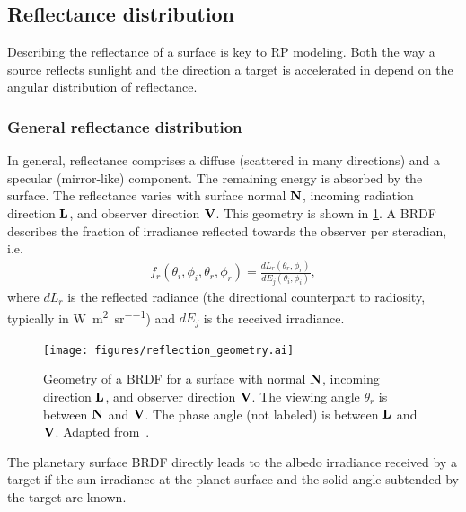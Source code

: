 \subsection{Reflectance distribution}
\label{subsec:general-reflectance-distribution}

Describing the reflectance of a surface is key to \gls{RP} modeling. Both the way a source reflects sunlight and the direction a target is accelerated in depend on the angular distribution of reflectance.

\subsubsection{General reflectance distribution}
In general, reflectance comprises a diffuse (scattered in many directions) and a specular (mirror-like) component. The remaining energy is absorbed by the surface. The reflectance varies with surface normal $\vb N$, incoming radiation direction $\vb L$, and observer direction $\vb V$. This geometry is shown in \cref{fig:reflection-geometry}. A \gls{BRDF} describes the fraction of irradiance reflected towards the observer per steradian, i.e.~\cite{Wetterer2014}
\begin{align}
    f_r (\theta_i, \phi_i, \theta_r, \phi_r)
    = \frac{dL_r(\theta_r, \phi_r)}
    {dE_j(\theta_i, \phi_i)},
\end{align}
where $dL_r$ is the reflected radiance (the directional counterpart to radiosity, typically in \unit{\W\per\square\m\per\steradian}) and $dE_j$ is the received irradiance.


\begin{figure}[t]
    \centering
    \texttt{[image: figures/reflection\_geometry.ai]}
    \caption{Geometry of a \gls{BRDF} for a surface with normal $\vb N$, incoming direction $\vb L$, and observer direction $\vb V$. The viewing angle $\theta_r$ is between $\vb N$ and $\vb V$. The phase angle (not labeled) is between $\vb L$ and $\vb V$. Adapted from~\cite{Wetterer2014}.}
    \label{fig:reflection-geometry}
\end{figure}

The planetary surface \gls{BRDF} directly leads to the albedo irradiance received by a target if the sun irradiance at the planet surface and the solid angle subtended by the target are known.

